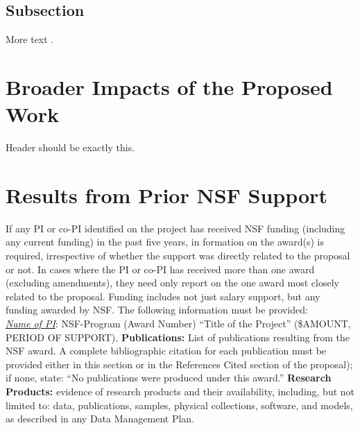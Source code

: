 \documentclass{proposalnsf}
\begin{document}
\subsection{Subsection}
More text \citep{Grapenthin2006}.

\section{Broader Impacts of the Proposed Work}
Header should be exactly this. 

\section{Results from Prior NSF Support}
If any PI or co-PI identified on the project has received NSF funding (including any current
funding) in the past five years, in formation on the award(s) is required,
irrespective of whether the support was directly related to the proposal or not.
In cases where the PI or co-PI has received more than one award (excluding amendments),
they need only report on the one award most closely related to the proposal. Funding includes not just salary
support, but any funding awarded by NSF. The following information must be provided:\\

\noindent
\emph{\underline{Name of PI}}: NSF-Program (Award Number) ``Title of the Project'' (\$AMOUNT, PERIOD OF SUPPORT). 
{\bf Publications:} List of publications resulting from the NSF award. A complete bibliographic citation for each
publication must be provided either in this section or in the References Cited section of the proposal); if
none, state: ``No publications were produced under this award.'' {\bf Research Products:} evidence of research products 
and their availability, including, but not limited to: data, publications, samples, physical collections, software, 
and models, as described in any Data Management Plan.


\newpage
{}
\renewcommand{\thepage} {E--\arabic{page}}






\newpage
{}
\renewcommand{\thepage} {F--\arabic{page}}
\end{document}
